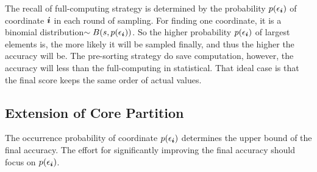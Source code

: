 \documentclass[letterpaper]{article}
\newcommand{\V}[1]{{\bm{{\MakeLowercase{#1}}}}}
\begin{document}
The recall of full-computing strategy is determined by
the probability $p(\epsilon_{\V{i}})$ of coordinate $\V{i}$ in each round of sampling.
For finding one coordinate, it is a binomial distribution$\sim B(s,p(\epsilon_{\V{i}}))$.
So the higher probability $p(\epsilon_{\V{i}})$ of largest elements is,
the more likely it will be sampled finally,
and thus the higher the accuracy will be.
The pre-sorting strategy do save computation,
however, the accuracy will less than the full-computing in statistical.
That ideal case is that the final score keeps the same order of actual values.

\subsection{Extension of Core Partition}

The occurrence probability of coordinate $p(\epsilon_{\V{i}})$ determines
the upper bound of the final accuracy.
The effort for significantly improving the final accuracy 
should focus on $p(\epsilon_{\V{i}})$.
\end{document}
